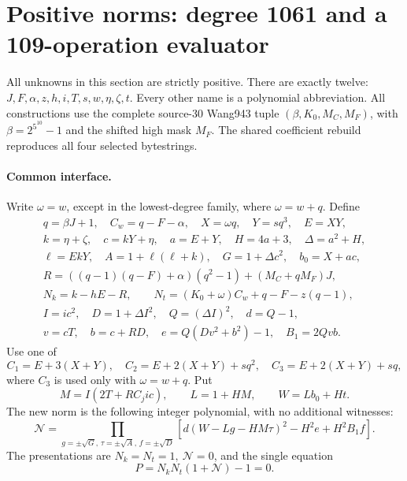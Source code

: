 \section{Positive norms: degree 1061 and a 109-operation evaluator}
\label{sec:positive-wave5}

All unknowns in this section are strictly positive.  There are exactly twelve:
$J,F,\alpha,z,h,i,T,s,w,\eta,\zeta,t$.  Every other name is a polynomial
abbreviation.  All constructions use the complete source-30 Wang943 tuple
$(\beta,K_0,M_C,M_F)$, with $\beta=2^{5^{10}}-1$ and the shifted high mask
$M_F$.  The shared coefficient rebuild reproduces all four selected bytestrings.

\paragraph{Common interface.}
Write $\omega=w$, except in the lowest-degree family, where $\omega=w+q$.
Define
\begin{gather*}
 q=\beta J+1,\quad C_w=q-F-\alpha,\quad X=\omega q,\quad Y=sq^3,\quad E=XY,\\
 k=\eta+\zeta,\quad c=kY+\eta,\quad a=E+Y,\quad H=4a+3,\quad\Delta=a^2+H,\\
 \ell=EkY,\quad A=1+\ell(\ell+k),\quad G=1+\Delta c^2,\quad b_0=X+ac,\\
 R=((q-1)(q-F)+\alpha)(q^2-1)+(M_C+qM_F)J,\\
 N_k=k-hE-R,\qquad N_t=(K_0+\omega)C_w+q-F-z(q-1),\\
 I=ic^2,\quad D=1+\Delta I^2,\quad Q=(\Delta I)^2,\quad d=Q-1,\\
 v=cT,\quad b=c+RD,\quad e=Q(Dv^2+b^2)-1,\quad B_1=2Qvb.
\end{gather*}
Use one of
\[
 C_1=E+3(X+Y),\quad C_2=E+2(X+Y)+sq^2,\quad
 C_3=E+2(X+Y)+sq,
\]
where $C_3$ is used only with $\omega=w+q$.  Put
\[
 M=I(2T+RC_jic),\qquad L=1+HM,\qquad W=Lb_0+Ht.
\]
The new norm is the following integer polynomial, with no additional witnesses:
\[
 \mathcal N=\prod_{g=\pm\sqrt G,\,\tau=\pm\sqrt A,\,f=\pm\sqrt D}
 \left[d(W-Lg-HM\tau)^2-H^2e+H^2B_1f\right].
\]
The presentations are $N_k=N_t=1,\ \mathcal N=0$, and the single equation
\[
 P=N_kN_t(1+\mathcal N)-1=0.
\]

